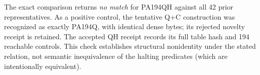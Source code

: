 The exact comparison returns \emph{no match} for PA194QH against all
42 prior representatives. As a positive control, the tentative Q+C
construction was recognized as exactly PA194Q, with identical dense bytes;
its rejected novelty receipt is retained. The accepted QH receipt records
its full table hash and 194 reachable controls. This check establishes
structural nonidentity under the stated relation, not semantic inequivalence
of the halting predicates (which are intentionally equivalent).
